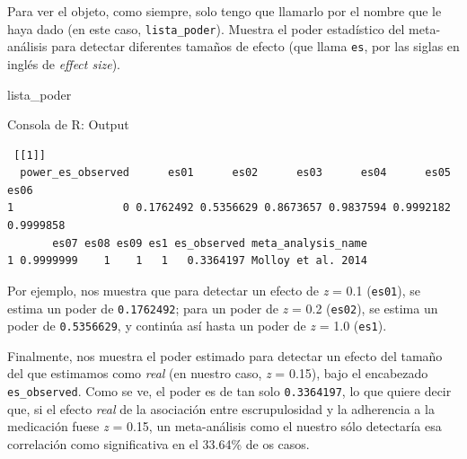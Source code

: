 \documentclass[
  bookmarksnumbered]{article}
\newenvironment{Shaded}{\begin{snugshade}}{\end{snugshade}}
\newcommand{\FunctionTok}[1]{\textcolor[rgb]{0.39,0.29,0.61}{#1}}
\newcommand{\NormalTok}[1]{\textcolor[rgb]{0.12,0.11,0.11}{#1}}
\newcommand{\OtherTok}[1]{\textcolor[rgb]{0.00,0.43,0.16}{#1}}
\newcommand{\SpecialCharTok}[1]{\textcolor[rgb]{0.24,0.68,0.91}{#1}}
\begin{document}
\begin{Shaded}
\end{Shaded}

Para ver el objeto, como siempre, solo tengo que llamarlo por el nombre que le haya dado (en este caso, \texttt{lista\_poder}). Muestra el poder estadístico del meta-análisis para detectar diferentes tamaños de efecto (que llama \texttt{es}, por las siglas en inglés de \emph{effect size}).

\begin{Shaded}
\begin{Highlighting}[]
\NormalTok{lista\_poder}
\end{Highlighting}
\end{Shaded}

\begin{ROut}{Consola de R: Output~\thetcbcounter}
                \begin{footnotesize}
                \begin{verbatim} [[1]]
  power_es_observed      es01      es02      es03      es04      es05      es06
1                 0 0.1762492 0.5356629 0.8673657 0.9837594 0.9992182 0.9999858
       es07 es08 es09 es1 es_observed meta_analysis_name
1 0.9999999    1    1   1   0.3364197 Molloy et al. 2014
 \end{verbatim}
                \end{footnotesize}
                \end{ROut}

Por ejemplo, nos muestra que para detectar un efecto de \emph{z} = 0.1 (\texttt{es01}), se estima un poder de \texttt{0.1762492}; para un poder de \emph{z} = 0.2 (\texttt{es02}), se estima un poder de \texttt{0.5356629}, y continúa así hasta un poder de \emph{z} = 1.0 (\texttt{es1}).

Finalmente, nos muestra el poder estimado para detectar un efecto del tamaño del que estimamos como \emph{real} (en nuestro caso, \emph{z} = 0.15), bajo el encabezado \texttt{es\_observed}. Como se ve, el poder es de tan solo \texttt{0.3364197}, lo que quiere decir que, si el efecto \emph{real} de la asociación entre escrupulosidad y la adherencia a la medicación fuese \emph{z} = 0.15, un meta-análisis como el nuestro sólo detectaría esa correlación como significativa en el 33.64\% de os casos.
\end{document}
